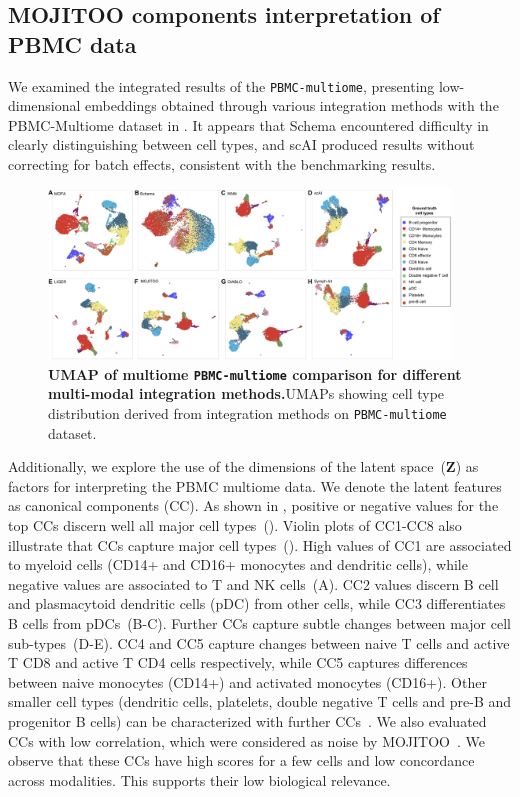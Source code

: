 \subsection{MOJITOO components interpretation of PBMC data}
\label{MOJITOO:out:pbmc}
We examined the integrated results of the \texttt{PBMC-multiome}, presenting low-dimensional embeddings obtained through various integration methods with the PBMC-Multiome dataset in . It appears that Schema encountered difficulty in clearly distinguishing between cell types, and scAI produced results without correcting for batch effects, consistent with the benchmarking results.
\begin{figure}[!ht]
	\centering
	\includegraphics[width=0.95\textwidth]{pbmc_multiome_umap/fig}
	\vspace{0.1cm}
	\caption[UMAP of multiome PBMC comparison for different multi-modal integration methods.]{\textbf{UMAP of multiome \texttt{PBMC-multiome} comparison for different multi-modal integration methods.}UMAPs showing cell type distribution derived from integration methods on \texttt{PBMC-multiome} dataset. }
	\label{fig:pbmc_multiome_umap}
\end{figure}




Additionally, we explore the use of the dimensions of the latent space~($\textbf{Z}$) as factors for interpreting the PBMC multiome data. We denote the latent features as canonical components (CC). As shown in , positive or negative values for the top CCs discern well all major cell types~(). Violin plots of CC1-CC8 also illustrate that CCs capture major cell types~(). High values of CC1 are associated to myeloid cells (CD14+ and CD16+ monocytes and dendritic cells), while negative values are associated to T and NK cells~(A). CC2 values discern B cell and plasmacytoid dendritic cells (pDC) from other cells, while CC3 differentiates B cells from pDCs~(B-C). Further CCs capture subtle changes between major cell sub-types~(D-E). CC4 and CC5 capture changes between naive T cells and active T CD8 and active T CD4 cells respectively, while CC5 captures differences between naive monocytes (CD14+) and activated monocytes (CD16+). Other smaller cell types (dendritic cells, platelets, double negative T cells and pre-B and progenitor B cells) can be characterized with further CCs~. We also evaluated CCs with low correlation, which were considered as noise by MOJITOO~. We observe that these CCs have high scores for a few cells and low concordance across modalities. This supports their low biological relevance.


